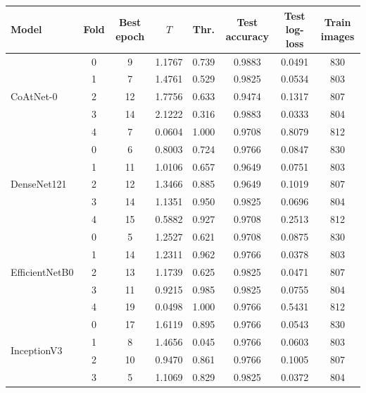 \documentclass[a4paper,fleqn]{cas-sc}
\begin{document}
\begin{heretable}
\centering
\caption{Binary detection: every full-image run. Every run took 260 optimiser steps. $T$ is the temperature fitted on the run's validation fold and Thr.\ the Youden threshold chosen there. Accuracy and log-loss are on the 171 test images after temperature scaling. In fold 4 the temperature of six models lies at or near the lower search bound $e^{-3}\approx 0.0498$.}
\label{tab:runs-binary}
\scriptsize
\begin{tabular*}{\textwidth}{@{\extracolsep{\fill}}lccccccc@{}}
\toprule
Model & Fold & Best epoch & $T$ & Thr. & Test accuracy & Test log-loss & Train images \\
\midrule
\multirow{5}{*}{CoAtNet-0} & 0 & 9 & 1.1767 & 0.739 & 0.9883 & 0.0491 & 830 \\
 & 1 & 7 & 1.4761 & 0.529 & 0.9825 & 0.0534 & 803 \\
 & 2 & 12 & 1.7756 & 0.633 & 0.9474 & 0.1317 & 807 \\
 & 3 & 14 & 2.1222 & 0.316 & 0.9883 & 0.0333 & 804 \\
 & 4 & 7 & 0.0604 & 1.000 & 0.9708 & 0.8079 & 812 \\
\midrule
\multirow{5}{*}{DenseNet121} & 0 & 6 & 0.8003 & 0.724 & 0.9766 & 0.0847 & 830 \\
 & 1 & 11 & 1.0106 & 0.657 & 0.9649 & 0.0751 & 803 \\
 & 2 & 12 & 1.3466 & 0.885 & 0.9649 & 0.1019 & 807 \\
 & 3 & 14 & 1.1351 & 0.950 & 0.9825 & 0.0696 & 804 \\
 & 4 & 15 & 0.5882 & 0.927 & 0.9708 & 0.2513 & 812 \\
\midrule
\multirow{5}{*}{EfficientNetB0} & 0 & 5 & 1.2527 & 0.621 & 0.9708 & 0.0875 & 830 \\
 & 1 & 14 & 1.2311 & 0.962 & 0.9766 & 0.0378 & 803 \\
 & 2 & 13 & 1.1739 & 0.625 & 0.9825 & 0.0471 & 807 \\
 & 3 & 11 & 0.9215 & 0.985 & 0.9825 & 0.0755 & 804 \\
 & 4 & 19 & 0.0498 & 1.000 & 0.9766 & 0.5431 & 812 \\
\midrule
\multirow{5}{*}{InceptionV3} & 0 & 17 & 1.6119 & 0.895 & 0.9766 & 0.0543 & 830 \\
 & 1 & 8 & 1.4656 & 0.045 & 0.9766 & 0.0603 & 803 \\
 & 2 & 10 & 0.9470 & 0.861 & 0.9766 & 0.1005 & 807 \\
 & 3 & 5 & 1.1069 & 0.829 & 0.9825 & 0.0372 & 804 \\

\end{tabular*}
\end{heretable}
\end{document}
